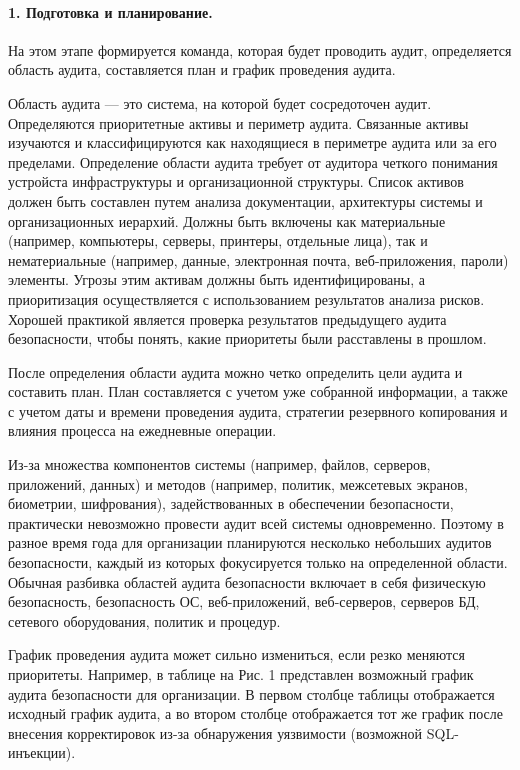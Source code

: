 \paragraph{1. Подготовка и планирование.}

На этом этапе формируется команда, которая будет проводить аудит, определяется область аудита, составляется план и график проведения аудита.

Область аудита — это система, на которой будет сосредоточен аудит. Определяются приоритетные активы и периметр аудита. Связанные активы изучаются и классифицируются как находящиеся в периметре аудита или за его пределами. Определение области аудита требует от аудитора четкого понимания устройста инфраструктуры и организационной структуры. Список активов должен быть составлен путем анализа документации, архитектуры системы и организационных иерархий. Должны быть включены как материальные (например, компьютеры, серверы, принтеры, отдельные лица), так и нематериальные (например, данные, электронная почта, веб-приложения, пароли) элементы. Угрозы этим активам должны быть идентифицированы, а приоритизация осуществляется с использованием результатов анализа рисков. Хорошей практикой является проверка результатов предыдущего аудита безопасности, чтобы понять, какие приоритеты были расставлены в прошлом.

После определения области аудита можно четко определить цели аудита и составить план. План составляется с учетом уже собранной информации, а также с учетом даты и времени проведения аудита, стратегии резервного копирования и влияния процесса на ежедневные операции.

Из-за множества компонентов системы (например, файлов, серверов, приложений, данных) и методов (например, политик, межсетевых экранов, биометрии, шифрования), задействованных в обеспечении безопасности, практически невозможно провести аудит всей системы одновременно. Поэтому в разное время года для организации планируются несколько небольших аудитов безопасности, каждый из которых фокусируется только на определенной области. Обычная разбивка областей аудита безопасности включает в себя физическую безопасность, безопасность ОС, веб-приложений, веб-серверов, серверов БД, сетевого оборудования, политик и процедур.

График проведения аудита может сильно измениться, если резко меняются приоритеты. Например, в таблице на Рис. 1 представлен возможный график аудита безопасности для организации. В первом столбце таблицы отображается исходный график аудита, а во втором столбце отображается тот же график после внесения корректировок из-за обнаружения уязвимости (возможной SQL-инъекции).

